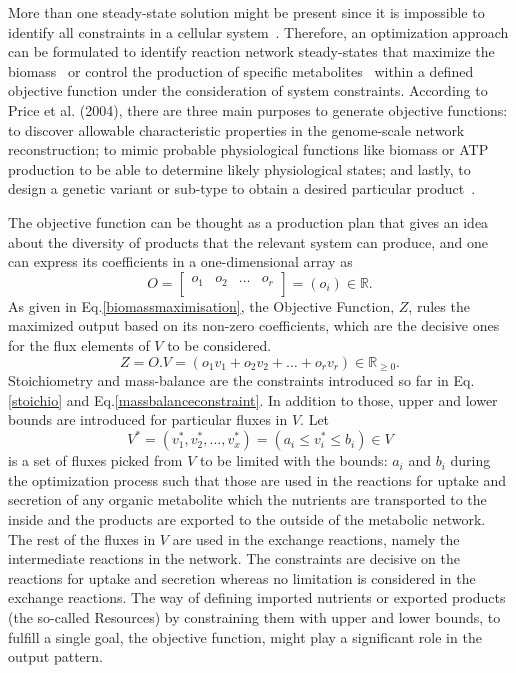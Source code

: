 More than one steady-state solution might be present since it is impossible to identify all constraints in a cellular system~\cite{KAUFFMAN2003491}. Therefore, an optimization approach can be formulated to identify reaction network steady-states that maximize the biomass~\cite{KAUFFMAN2003491,PRICE2004} or control the production of specific metabolites~\cite{VARMA1993} within a defined objective function under the consideration of system constraints. According to Price et al. (2004),
there are three main purposes to generate objective functions: to discover allowable characteristic properties in the genome-scale network reconstruction; to mimic probable physiological functions like biomass or ATP production to be able to determine likely physiological states; and lastly, to design a genetic variant or sub-type to obtain a desired particular product~\cite{PRICE2004}.

The objective function can be thought as a production plan that gives an idea about the diversity of products that the relevant system can produce, and one can express its coefficients in a one-dimensional array as
\begin{equation} \tag{4}
	O =  \begin{bmatrix}
			o_{1} & o_{2} & \dots  & o_{r}\\
		\end{bmatrix}=(o_{i})\in \mathbb{R}.
	\label{objectivecoefficients}
\end{equation}
As given in Eq.\eqref{biomassmaximisation}, the Objective Function, $Z$, rules the maximized output based on its non-zero coefficients, which are the decisive ones for the flux elements of $V$ to be considered.
\begin{equation} \tag{5}
	Z = O.V = (o_{1}v_{1} + o_{2}v_{2} + \dots + o_{r}v_{r})\in \mathbb{R}_{\ge0}.
	\label{biomassmaximisation}
\end{equation}
Stoichiometry and mass-balance are the constraints introduced so far in Eq.\eqref{stoichio} and Eq.\eqref{massbalanceconstraint}. In addition to those, upper and lower bounds are introduced for particular fluxes in $V$. Let
\begin{equation} \tag{6}
	V^{*}=(v^{*}_{1}, v^{*}_{2},\dots, v^{*}_{x})= (a_{i}\le v^{*}_{i}\le b_{i})\in V
	\label{constrainedfluxlist}
\end{equation}
is a set of fluxes picked from $V$ to be limited with the bounds: $a_{i}$ and $b_{i}$ during the optimization process such that those are used in the reactions for uptake and secretion of any organic metabolite which the nutrients are transported to the inside and the products are exported to the outside of the metabolic network. The rest of the fluxes in $V$ are used in the exchange reactions, namely the intermediate reactions in the network. The constraints are decisive on the reactions for uptake and secretion whereas no limitation is considered in the exchange reactions. The way of defining imported nutrients or exported products (the so-called Resources) by constraining them with upper and lower bounds, to fulfill a single goal, the objective function, might play a significant role in the output pattern.

